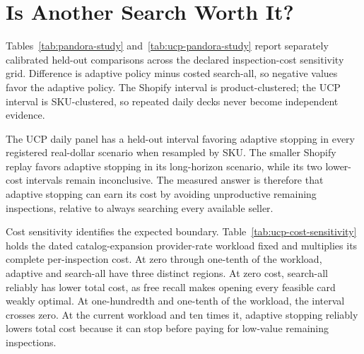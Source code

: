 \section{Is Another Search Worth It?}
\label{sec:results}

Tables~\ref{tab:pandora-study} and~\ref{tab:ucp-pandora-study} report separately
calibrated held-out comparisons across the declared inspection-cost sensitivity grid.
Difference is adaptive policy minus costed search-all, so
negative values favor the adaptive policy. The Shopify interval is product-clustered;
the UCP interval is SKU-clustered, so repeated daily decks never become independent
evidence.

\begin{table}[htbp]
  \centering
  \small
  
  \caption{Held-out costly-search study on a frozen Shopify seller-deck snapshot.
  Each row has four independent held-out product decks. Search-all opens every
  available card and pays every declared inspection cost. Lower total acquisition
  cost is better.}
  \label{tab:pandora-study}
\end{table}

\begin{table}[htbp]
  \centering
  \small
  
  \caption{Held-out costly-search replay on the quality-included September UCP daily
  panel. Each SKU and all of its dates are assigned together to calibration or
  evaluation. Search-all opens every available card and pays every declared inspection
  cost. Merchant domains are observed catalog cards, not verified checkout offers.
  Lower total acquisition cost is better.}
  \label{tab:ucp-pandora-study}
\end{table}

The UCP daily panel has a held-out interval favoring adaptive stopping in every
registered real-dollar scenario when resampled by SKU. The smaller Shopify replay
favors adaptive stopping in its long-horizon scenario, while its two lower-cost
intervals remain inconclusive. The measured answer is therefore that adaptive stopping
can earn its cost by avoiding unproductive remaining inspections, relative to always
searching every available seller.

Cost sensitivity identifies the expected boundary. Table~\ref{tab:ucp-cost-sensitivity}
holds the dated catalog-expansion provider-rate workload fixed and multiplies its
complete per-inspection cost. At zero through one-tenth of the workload, adaptive and
search-all have three distinct regions. At zero cost, search-all reliably has lower
total cost, as free recall makes opening every feasible card weakly optimal. At
one-hundredth and one-tenth of the workload, the interval crosses zero. At the current
workload and ten times it,
adaptive stopping reliably lowers total cost because it can stop before paying for
low-value remaining inspections.

